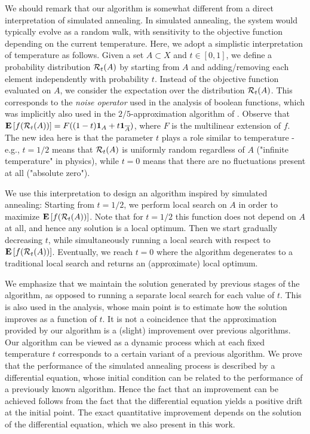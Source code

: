 \documentclass{article}[11pt]
\newcommand{\E}[1]{{\bf{E}}\left[#1\right]}
\def\b1{{\bf 1}}
\begin{document}
We should remark that our algorithm is somewhat different from a direct interpretation of
simulated annealing. In simulated annealing, the system would typically evolve as a random walk,
with sensitivity to the objective function depending on the current temperature. Here,
we adopt a simplistic interpretation of temperature as follows.
Given a set $A \subset X$ and $t \in [0,1]$, we define a probability distribution
${\cal R}_t(A)$ by starting from $A$ and adding/removing each element independently with probability $t$.
Instead of the objective function evaluated on $A$, we consider the expectation over
the distribution ${\cal R}_t(A)$.
This corresponds to the {\em noise operator} used in the analysis of boolean functions,
which was implicitly also used in the $2/5$-approximation algorithm of \cite{FMV07}.
Observe that $\E{f({\cal R}_t(A))} = F((1-t) \b1_A + t \b1_{\overline{A}})$,
where $F$ is the multilinear extension of $f$.
The new idea here is that the parameter $t$ plays a role similar to temperature
- e.g., $t=1/2$ means that ${\cal R}_t(A)$ is uniformly random regardless of $A$
("infinite temperature" in physics), while $t=0$ means that there are no fluctuations
present at all ("absolute zero").

We use this interpretation to design an algorithm inspired by simulated annealing:
Starting from $t=1/2$,
we perform local search on $A$ in order to maximize $\E{f({\cal R}_t(A))}$.
Note that for $t=1/2$ this function does not depend on $A$ at all,
and hence any solution is a local optimum.
Then we start gradually decreasing $t$,
while simultaneously running a local search with respect to $\E{f({\cal R}_t(A))}$.
Eventually, we reach $t=0$ where
the algorithm degenerates to a traditional local search and returns an
(approximate) local optimum.

We emphasize that we maintain the solution generated by previous stages
of the algorithm, as opposed to running a separate local search for each value of $t$. 
This is also used in the analysis, whose main point is to estimate
how the solution improves as a function of $t$.
It is not a coincidence that the approximation provided by our algorithm
is a (slight) improvement over previous algorithms. Our algorithm can be viewed
as a dynamic process which at each fixed temperature $t$ corresponds to a certain
variant of a previous algorithm. We prove that the performance of the simulated annealing
process is described by a differential equation, whose initial condition can be
related to the performance of a previously known algorithm. Hence the fact that an improvement
can be achieved follows from the fact that the differential equation yields
a positive drift at the initial point. The exact quantitative improvement depends
on the solution of the differential equation, which we also present in this work.
\end{document}
